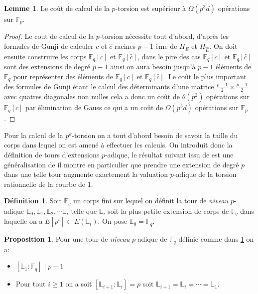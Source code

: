 \documentclass[10pt,a4paper]{book}
\theoremstyle{plain}
\theoremstyle{definition}
\newtheorem{lem}[thm]{Lemme}
\theoremstyle{definition}
\theoremstyle{definition}
\newtheorem{prop}[thm]{Proposition}
\theoremstyle{definition}
\newtheorem{defi}[thm]{Définition}
\theoremstyle{remark}
\theoremstyle{remark}
\begin{document}
\begin{lem}
Le coût de calcul de la $p$-torsion est supérieur à  $\Omega(p^3d)$ opérations sur $\mathbb{F}_p$.
\end{lem}

\begin{proof}
Le cout de calcul de la $p$-torsion nécessite tout d'abord, d'après les formules de Gunji de calculer $c$ et $\widehat{c}$ racines $p-1$ ème de $H_{E}$ et $H_{\widehat{E}}$. On doit ensuite construire les corps $\mathbb{F}_q[c]$ et $\mathbb{F}_q[\widehat{c}]$, dans le pire des cas $\mathbb{F}_q[c]$ et $\mathbb{F}_q[\widehat{c}]$ sont des extensions de degré $p-1$ ainsi on aura besoin jusqu'à $p-1$ éléments de $\mathbb{F}_q$ pour représenter des éléments de $\mathbb{F}_q[c]$ et $\mathbb{F}_q[\widehat{c}]$. Le coût le plus important des formules de Gunji étant le calcul des déterminants d'une matrice $\frac{p-1}{2} \times \frac{p-1}{2}$ avec quatres diagonales non nulles cela a donc un coût de $\theta(p^2)$ opérations sur $\mathbb{F}_q[c]$ par élimination de Gauss ce qui a un coût de $\Omega(p^3d)$ opérations sur $\mathbb{F}_p$.
\end{proof}

Pour la calcul de la $p^k$-torsion on a tout d'abord besoin de savoir la taille du corps dans lequel on est amené à effectuer les calculs. On introduit donc la définition de tours d'extensions $p$-adique, le résultat suivant issu de \cite{DeFeo10} est une généralisation de \cite[Proposition 26]{Ler97a} il montre en particulier que prendre une extension de degré $p$ dans une telle tour augmente exactement la valuation $p$-adique de la torsion rationnelle de la courbe de $1$.

\begin{defi}
\label{def:p-adic:level}
Soit $\mathbb{F}_q$ un corps fini sur lequel on définit la tour de \emph{niveau} $p$-adique  $\mathbb{L}_0,  \mathbb{L}_1, \mathbb{L}_2, \cdots \mathbb{L}_i$ telle que $\mathbb{L}_i$ soit la plus petite extension de corps de $\mathbb{F}_q$ dans laquelle on a $E[p^i] \subset E(\mathbb{L}_i)$. On pose $\mathbb{L}_0=\mathbb{F}_q$.
\end{defi}

\begin{prop}
\label{pro:ord:fro}
Pour une tour de \emph{niveau} $p$-adique de $\mathbb{F}_q$ définie comme dans \ref{def:p-adic:level} on a:
\begin{itemize}
\item $[\mathbb{L}_1:\mathbb{F}_q] \mid p-1$
\item Pour tout $i \geqslant 1$ on a soit $[\mathbb{L}_{i+1}:\mathbb{L}_{i}]=p$ soit $\mathbb{L}_{i+1}=\mathbb{L}_{i}=\cdots = \mathbb{L}_{1}$.
\end{itemize}
\end{prop}
\end{document}
